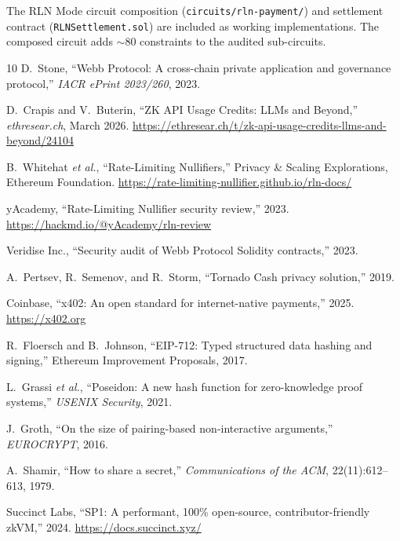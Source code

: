 \documentclass[11pt,a4paper]{article}
\theoremstyle{definition}
\begin{document}
The RLN Mode circuit composition (\texttt{circuits/rln-payment/}) and settlement contract (\texttt{RLNSettlement.sol}) are included as working implementations. The composed circuit adds $\sim$80 constraints to the audited sub-circuits.

\begin{thebibliography}{10}
 D.~Stone, ``Webb Protocol: A cross-chain private application and governance protocol,'' \emph{IACR ePrint 2023/260}, 2023.

 D.~Crapis and V.~Buterin, ``ZK API Usage Credits: LLMs and Beyond,'' \emph{ethresear.ch}, March 2026. \url{https://ethresear.ch/t/zk-api-usage-credits-llms-and-beyond/24104}

 B.~Whitehat \emph{et al.}, ``Rate-Limiting Nullifiers,'' Privacy \& Scaling Explorations, Ethereum Foundation. \url{https://rate-limiting-nullifier.github.io/rln-docs/}

 yAcademy, ``Rate-Limiting Nullifier security review,'' 2023. \url{https://hackmd.io/@yAcademy/rln-review}

 Veridise Inc., ``Security audit of Webb Protocol Solidity contracts,'' 2023.

 A.~Pertsev, R.~Semenov, and R.~Storm, ``Tornado Cash privacy solution,'' 2019.

 Coinbase, ``x402: An open standard for internet-native payments,'' 2025. \url{https://x402.org}

 R.~Floersch and B.~Johnson, ``EIP-712: Typed structured data hashing and signing,'' Ethereum Improvement Proposals, 2017.

 L.~Grassi \emph{et al.}, ``Poseidon: A new hash function for zero-knowledge proof systems,'' \emph{USENIX Security}, 2021.

 J.~Groth, ``On the size of pairing-based non-interactive arguments,'' \emph{EUROCRYPT}, 2016.

 A.~Shamir, ``How to share a secret,'' \emph{Communications of the ACM}, 22(11):612--613, 1979.

 Succinct Labs, ``SP1: A performant, 100\% open-source, contributor-friendly zkVM,'' 2024. \url{https://docs.succinct.xyz/}
\end{thebibliography}
\end{document}
